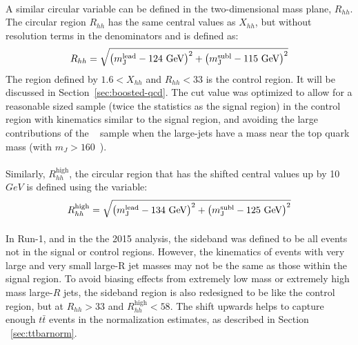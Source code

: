 \paragraph{}
A similar circular variable can be defined in the two-dimensional mass plane, $R_{hh}$. The circular region $R_{hh}$ has the same central values as $X_{hh}$, but without resolution terms in the denominators and is defined as:
\begin{equation}
\label{eq:boosted_RhhDef}
R_{hh} = \sqrt{\left(m^{\rm lead}_{\rm J} - \text{124 GeV}\right)^2 + \left(m^{\rm subl}_{\rm J} - \text{115 GeV}\right)^2}
\end{equation}
The region defined by $1.6 < X_{hh}$ and $R_{hh} < 33$ is the control region. It will be discussed in Section~\ref{sec:boosted-qcd}.
The cut value was optimized to allow for a reasonable sized sample (twice the statistics as the signal region) in the control region with kinematics similar to the signal region, and avoiding the large contributions of the \ttbar~ sample when the large-\R jets have a mass near the top quark mass (with $m_J > 160$~\GeV).

\paragraph{}
Similarly, $R_{hh}^{\text{high}}$, the circular region that has the shifted central values up by 10 $GeV$ is defined using the variable:\begin{equation}
\label{eq:boosted_RhhhighDef}
R_{hh}^{\text{high}} = \sqrt{\left(m^{\rm lead}_{\rm J} - \text{134 GeV}\right)^2 + \left(m^{\rm subl}_{\rm J} - \text{125 GeV}\right)^2}
\end{equation}

\paragraph{}
In Run-1, and in the the 2015 analysis, the sideband was defined to be all events not in the signal or control regions. However, the kinematics of events with very large and very small large-R jet masses may not be the same as those within the signal region.
To avoid biasing effects from extremely low mass or extremely high mass large-$R$ jets, the sideband region is also redesigned to be like the control region, but at $R_{hh} > 33$ and $R_{hh}^{\text{high}} < 58$.
The shift upwards helps to capture enough $t\bar{t}$ events in the normalization estimates, as described in Section ~\ref{sec:ttbarnorm}.


